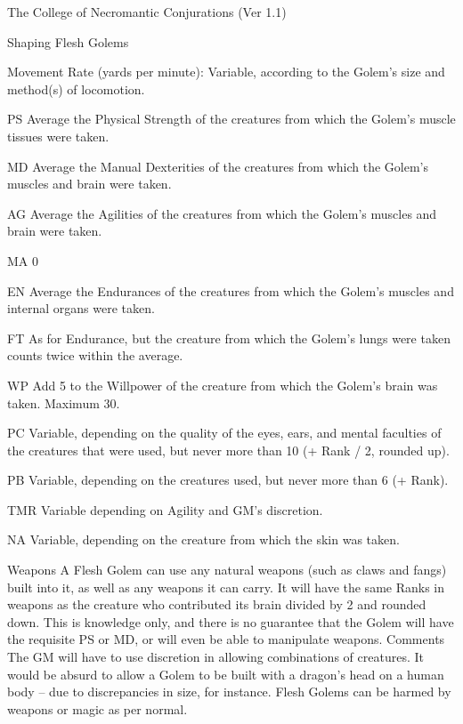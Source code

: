 \begin{Chapter}{The College of Necromantic Conjurations (Ver 1.1)}
\begin{ritual}[R-4]{Shaping Flesh Golems}
\begin{effects}
\begin{Description}
\item[Movement Rate] (yards per minute): Variable, according to the
  Golem’s size and method(s) of locomotion.

\item[PS] Average the Physical Strength of the creatures 
from which the Golem’s muscle tissues were taken. 

\item[MD] Average the Manual Dexterities of the creatures from which
  the Golem’s muscles and brain were taken.
  
\item[AG] Average the Agilities of the creatures from 
which the Golem’s muscles and brain were taken. 

\item[MA] 0 

\item[EN] Average the Endurances of the creatures from which the
  Golem’s muscles and internal organs were taken.

\item[FT] As for Endurance, but the creature from which the Golem’s
  lungs were taken counts twice within the average.

\item[WP] Add 5 to the Willpower of the creature from which the
  Golem’s brain was taken. Maximum 30.

\item[PC] Variable, depending on the quality of the eyes, ears, and
  mental faculties of the creatures that were used, but never more
  than 10 (+ Rank / 2, rounded up).

\item[PB] Variable, depending on the creatures used, but never more
  than 6 (+ Rank).

\item[TMR] Variable depending on Agility and GM’s discretion.

\item[NA] Variable, depending on the creature from which the skin was
  taken.

\item[Weapons] A Flesh Golem can use any natural weapons (such as
  claws and fangs) built into it, as well as any weapons it can
  carry. It will have the same Ranks in weapons as the creature who
  contributed its brain divided by 2 and rounded down.  This is
  knowledge only, and there is no guarantee that the Golem will have
  the requisite PS or MD, or will even be able to manipulate weapons.
  Comments The GM will have to use discretion in allowing combinations
  of creatures.  It would be absurd to allow a Golem to be built with
  a dragon’s head on a human body – due to discrepancies in size, for
  instance. Flesh Golems can be harmed by weapons or magic as per
  normal.
\end{Description}


\end{effects}
\end{ritual}
\end{Chapter}
